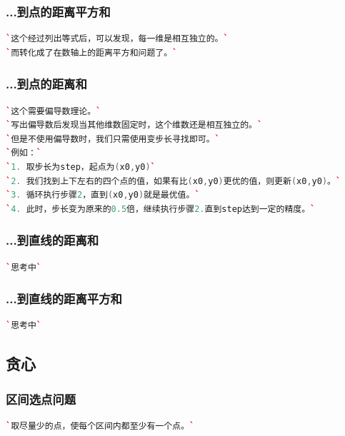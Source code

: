 \documentclass[a4paper]{article}
\begin{document}
\begin{CJK*}{UTF8}{gbsn}
\begin{multicols}{3}
\begin{flushleft}
\subsubsection{...到点的距离平方和}
\begin{lstlisting}[language={c++}]
`这个经过列出等式后，可以发现，每一维是相互独立的。`
`而转化成了在数轴上的距离平方和问题了。`
\end{lstlisting}

\subsubsection{...到点的距离和}
\begin{lstlisting}[language={c++}]
`这个需要偏导数理论。`
`写出偏导数后发现当其他维数固定时，这个维数还是相互独立的。`
`但是不使用偏导数时，我们只需使用变步长寻找即可。`
`例如：`
`1. 取步长为step，起点为(x0,y0)`
`2. 我们找到上下左右的四个点的值，如果有比(x0,y0)更优的值，则更新(x0,y0)。`
`3. 循环执行步骤2，直到(x0,y0)就是最优值。`
`4. 此时，步长变为原来的0.5倍，继续执行步骤2.直到step达到一定的精度。`
\end{lstlisting}

\subsubsection{...到直线的距离和}
\begin{lstlisting}[language={c++}]
`思考中`
\end{lstlisting}


\subsubsection{...到直线的距离平方和}
\begin{lstlisting}[language={c++}]
`思考中`
\end{lstlisting}



\subsection{贪心}

\subsubsection{区间选点问题}
\begin{lstlisting}[language={c++}]
`取尽量少的点，使每个区间内都至少有一个点。`
\end{lstlisting}


\end{flushleft}
\end{multicols}
\end{CJK*}
\end{document}
